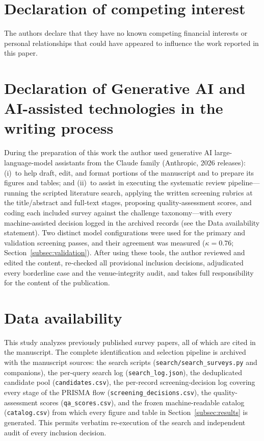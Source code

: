 \documentclass[a4paper,fleqn]{cas-sc}
\begin{document}
\section*{Declaration of competing interest}
The authors declare that they have no known competing financial interests or personal relationships that could have appeared to influence the work reported in this paper.

\section*{Declaration of Generative AI and AI-assisted technologies in the writing process}
During the preparation of this work the author used generative AI large-language-model assistants from the Claude family (Anthropic, 2026 releases): (i)~to help draft, edit, and format portions of the manuscript and to prepare its figures and tables; and (ii)~to assist in executing the systematic review pipeline---running the scripted literature search, applying the written screening rubrics at the title/abstract and full-text stages, proposing quality-assessment scores, and coding each included survey against the challenge taxonomy---with every machine-assisted decision logged in the archived records (see the Data availability statement). Two distinct model configurations were used for the primary and validation screening passes, and their agreement was measured ($\kappa = 0.76$; Section~\ref{subsec:validation}). After using these tools, the author reviewed and edited the content, re-checked all provisional inclusion decisions, adjudicated every borderline case and the venue-integrity audit, and takes full responsibility for the content of the publication.

\section*{Data availability}
This study analyzes previously published survey papers, all of which are cited in the manuscript. The complete identification and selection pipeline is archived with the manuscript sources: the search scripts (\texttt{search/search\_surveys.py} and companions), the per-query search log (\texttt{search\_log.json}), the deduplicated candidate pool (\texttt{candidates.csv}), the per-record screening-decision log covering every stage of the PRISMA flow (\texttt{screening\_decisions.csv}), the quality-assessment scores (\texttt{qa\_scores.csv}), and the frozen machine-readable catalog (\texttt{catalog.csv}) from which every figure and table in Section~\ref{subsec:results} is generated. This permits verbatim re-execution of the search and independent audit of every inclusion decision.
\end{document}
